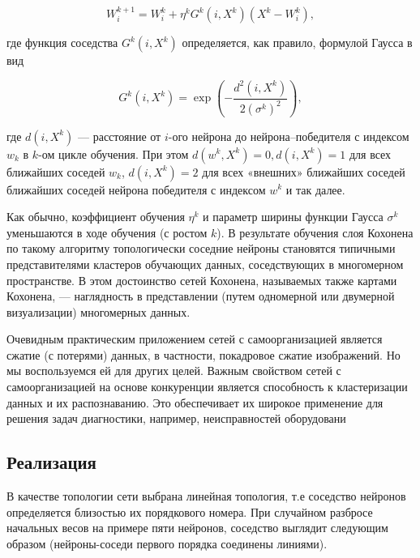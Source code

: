 \begin{equation}
W _ { i } ^ { k + 1 } = W _ { i } ^ { k } + \eta ^ { k } G ^ { k } \left( i , X ^ { k } \right) \left( X ^ { k } - W _ { i } ^ { k } \right),
\end{equation}


где функция соседства $G ^ { k } \left( i , X ^ { k } \right)$ определяется, как правило, формулой Гаусса в вид

\begin{equation}
G ^ { k } \left( i , X ^ { k } \right) = \exp \left( - \frac { d ^ { 2 } \left( i , X ^ { k } \right) } { 2 \left( \sigma ^ { k } \right) ^ { 2 } } \right),
\end{equation}

где $d \left( i , X ^ { k } \right)$ ---  расстояние от $i$-ого нейрона до нейрона–победителя с индексом $w_k$ в $k$-ом цикле обучения. При этом $d \left( w ^ { k } , X ^ { k } \right) = 0 , d \left( i , X ^ { k } \right) = 1$ для всех ближайших соседей $w_k$, $d(i, X^k) = 2$ для всех «внешних» ближайших соседей ближайших соседей нейрона победителя с индексом $w^k$ и так далее.

Как обычно, коэффициент обучения $\eta^k$ и параметр ширины функции
Гаусса $\sigma^k$ уменьшаются в ходе обучения (с ростом $k$). В результате обучения слоя Кохонена по такому алгоритму топологически
соседние нейроны становятся типичными представителями кластеров обучающих данных, соседствующих в многомерном пространстве.
В этом достоинство сетей Кохонена, называемых также картами Кохонена, — наглядность в представлении (путем одномерной или двумерной
визуализации) многомерных данных.

Очевидным практическим приложением сетей с самоорганизацией является
сжатие (с потерями) данных, в частности, покадровое сжатие изображений.
Но мы воспользуемся ей для других целей.
Важным свойством сетей с самоорганизацией на основе конкуренции
является способность к кластеризации данных и их распознаванию. Это
обеспечивает их широкое применение для решения задач диагностики,
например, неисправностей оборудовани


\subsection{Реализация}

В качестве топологии сети выбрана линейная топология, т.е соседство нейронов определяется близостью их порядкового номера. При случайном разбросе начальных весов на примере пяти нейронов, соседство выглядит следующим образом (нейроны-соседи первого порядка соединены линиями).

